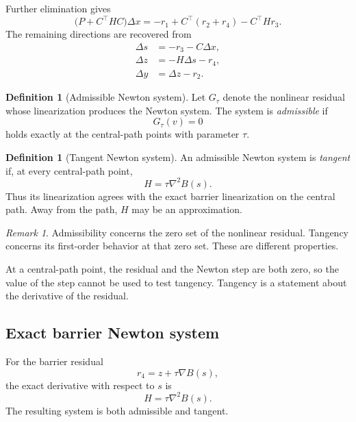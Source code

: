 \documentclass[a4paper,11pt]{book}
\theoremstyle{plain}
\theoremstyle{definition}
\newtheorem{definition}[theorem]{Definition}
\theoremstyle{remark}
\newtheorem{remark}[theorem]{Remark}
\numberwithin{equation}{chapter}
\numberwithin{algorithm}{chapter}
\begin{document}
	Further elimination gives
	\begin{equation}
		\bigl(
		P+C^\top HC
		\bigr)\Delta x
		=
		-r_1
		+
		C^\top(r_2+r_4)
		-
		C^\top Hr_3.
		\label{eq:condensed-primal-dual-system}
	\end{equation}
	The remaining directions are recovered from
	\begin{align}
		\Delta s&=-r_3-C\Delta x,\\
		\Delta z&=-H\Delta s-r_4,\\
		\Delta y&=\Delta z-r_2.
	\end{align}
	
	\begin{definition}[Admissible Newton system]
		Let \(G_\tau\) denote the nonlinear residual whose linearization produces
		the Newton system. The system is \emph{admissible} if
		\[
		G_\tau(v)=0
		\]
		holds exactly at the central-path points with parameter \(\tau\).
	\end{definition}
	
	\begin{definition}[Tangent Newton system]
		An admissible Newton system is \emph{tangent} if, at every central-path
		point,
		\begin{equation}
			H=\tau\nabla^2B(s).
		\end{equation}
		Thus its linearization agrees with the exact barrier linearization on the
		central path. Away from the path, \(H\) may be an approximation.
	\end{definition}
	
	\begin{remark}
		Admissibility concerns the zero set of the nonlinear residual. Tangency
		concerns its first-order behavior at that zero set. These are different
		properties.
		
		At a central-path point, the residual and the Newton step are both zero, so
		the value of the step cannot be used to test tangency. Tangency is a
		statement about the derivative of the residual.
	\end{remark}
	
	\subsection{Exact barrier Newton system}
	
	For the barrier residual
	\[
	r_4=z+\tau\nabla B(s),
	\]
	the exact derivative with respect to \(s\) is
	\[
	H=\tau\nabla^2B(s).
	\]
	The resulting system is both admissible and tangent.
	
\end{document}
